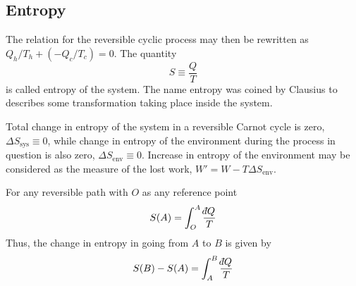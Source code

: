 \documentclass[../../../Main.tex]{subfiles}
\begin{document}
\subsection{Entropy}
The relation for the reversible cyclic process may then be rewritten as $Q_h /T_h + (-Q_c /T_c ) = 0$. The quantity
\begin{equation*}
    S\equiv \frac{Q}{T}
\end{equation*}
is called entropy of the system. The name entropy was coined by Clausius to describes some transformation taking place inside the system.  

Total change in entropy of the system in a reversible Carnot cycle is zero, $\Delta S_{\text{sys}}\equiv0$, while change in entropy of the environment during the process in question is also zero, $\Delta S_{\text{env}}\equiv 0$. Increase in entropy of the environment may be considered as the measure of the lost work, $W'=W-T\Delta S_{\text{env}}$.

For any reversible path with $O$ as any reference point 
\begin{equation*}
    S(A)=\int_O^A\frac{\dbar Q}{T}
\end{equation*}
Thus, the change in entropy in going from $A$ to $B$ is given by
\begin{equation*}
    S(B)-S(A)=\int_A^B\frac{\dbar Q}{T}
\end{equation*}
\end{document}
